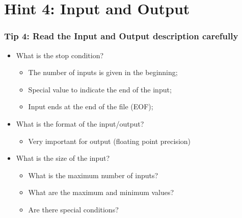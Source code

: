 
%
%

\section{Hint 4: Input and Output}
\begin{frame}
  \frametitle{Tip 4: Read the Input and Output description carefully}

  \begin{itemize}
  \item What is the stop condition?
  \begin{itemize}
    \item The number of inputs is given in the beginning;
    \item Special value to indicate the end of the input;
    \item Input ends at the end of the file (EOF);
  \end{itemize}
  \medskip

  \item What is the format of the input/output?
  \begin{itemize}
    \item Very important for output (floating point precision)
  \end{itemize}
  \medskip

  \item What is the size of the input?
  \begin{itemize}
    \item What is the maximum number of inputs?
    \item What are the maximum and minimum values?
    \item Are there special conditions?
  \end{itemize}
  \end{itemize}
\end{frame}



